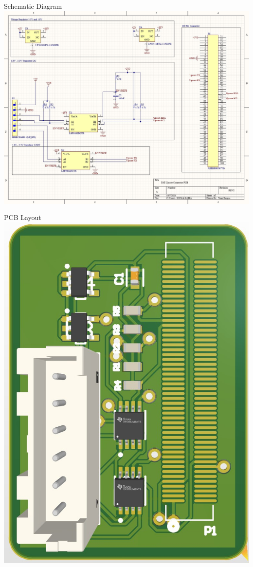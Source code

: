 
\begin{frame}{Schematic Diagram}
    \centering
    \includegraphics[height=.8\textheight,width=.8\textwidth,keepaspectratio]{images/rtt/i2cSch.jpg}
\end{frame}
\begin{frame}{PCB Layout}
    \centering
    \includegraphics[height=.8\textheight,width=.8\textwidth,keepaspectratio]{images/rtt/pcbLayout.jpg}
\end{frame}
